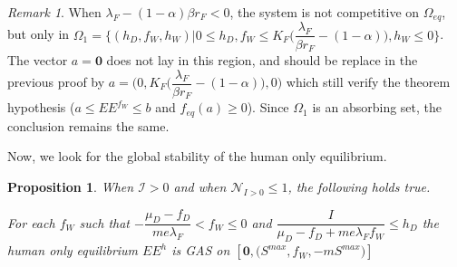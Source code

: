 \documentclass{article}
\newcommand{\lfw}{\lambda_{F}}
\newcommand{\lfw}{\lambda_{F}}
\newcommand{\cI}{\mathcal{I}}
\newtheorem{prop}[theorem]{Proposition}
\theoremstyle{definition}
\theoremstyle{remark}
\newtheorem{remark}[theorem]{Remark}
\begin{document}
\begin{remark}
When $\lfw - (1-\alpha)\beta r_F < 0$, the system is not competitive on $\Omega_{eq}$, but only in $\Omega_1 = \Big\{(h_D, f_W, h_W) | 0 \leq h_D, f_W \leq K_F\big(\dfrac{\lfw}{\beta r_F}-(1-\alpha)\big), h_W \leq 0 \Big\}$. The vector $a = \mathbf{0}$ does not lay in this region, and should be replace in the previous proof by $a = \Big(0, K_F\big(\dfrac{\lfw}{\beta r_F}-(1-\alpha)\big), 0)$ which still verify the theorem hypothesis ($a \leq EE^{f_W} \leq b$ and $f_{eq}(a) \geq 0$). Since $\Omega_1$ is an absorbing set, the conclusion remains the same.
\end{remark}

Now, we look for the global stability of the human only equilibrium.

\begin{prop}
When $\cI > 0$ and when $\mathcal{N}_{I>0} \leq 1$, the following holds true.

For each $f_W$ such that $-\dfrac{\mu_D-f_D}{me \lfw} < f_W \leq 0$ and $\dfrac{I}{\mu_D - f_D + me \lfw f_W} \leq h_D$ the human only equilibrium $EE^{h}$ is GAS on $[\mathbf{0}, \Big(S^{max}, f_W, - m S^{max}\Big)]$
\end{prop}
\end{document}
